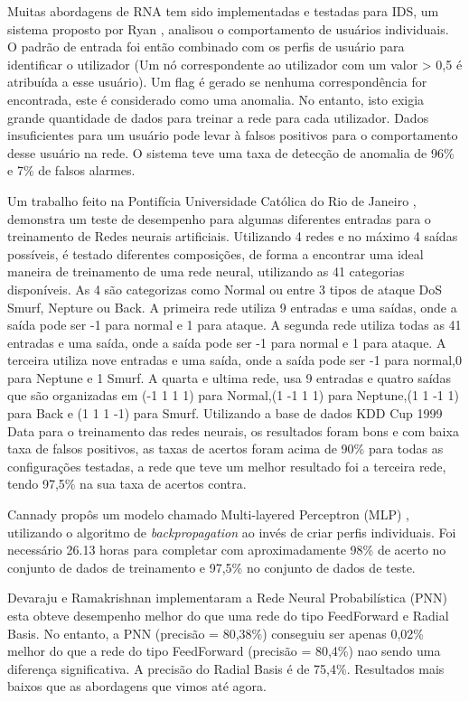 Muitas abordagens de RNA tem sido implementadas e testadas para IDS, um sistema proposto por Ryan \cite{Ryan}, analisou  o comportamento de usuários individuais. O padrão de entrada foi então combinado com os perfis de usuário para identificar o utilizador (Um nó correspondente ao utilizador com um valor > 0,5 é atribuída a esse usuário). Um flag é gerado se nenhuma correspondência for encontrada,  este é considerado como uma anomalia. No entanto, isto exigia grande quantidade de dados para treinar a rede para cada utilizador. Dados insuficientes para um usuário pode levar à falsos positivos para o comportamento desse usuário na rede. O sistema teve uma taxa de detecção de anomalia de 96\% e 7\% de falsos alarmes.

Um trabalho feito na Pontifícia Universidade Católica do Rio de Janeiro \cite{RenatoMaia}, demonstra um teste de desempenho para algumas diferentes entradas para o treinamento de Redes neurais artificiais.
Utilizando 4 redes e no máximo 4 saídas possíveis, é testado diferentes composições, de forma a encontrar uma ideal maneira de treinamento de uma rede neural, utilizando as 41 categorias disponíveis.
As 4 são categorizas como Normal ou entre 3 tipos de ataque DoS Smurf, Nepture ou Back.
A primeira rede utiliza 9 entradas e uma saídas, onde a saída pode ser -1 para normal e 1 para ataque.
A segunda rede utiliza todas as 41 entradas e uma saída, onde a saída pode ser -1 para normal e 1 para ataque.
A terceira utiliza nove entradas e uma saída, onde a saída pode ser -1 para normal,0 para Neptune e 1 Smurf.
A quarta e ultima rede, usa 9 entradas e quatro saídas que são organizadas em (-1 1 1 1) para Normal,(1 -1 1 1) para Neptune,(1 1 -1 1) para Back e (1 1 1 -1) para Smurf.
Utilizando a base de dados KDD Cup 1999 Data\cite{KDDCup99} para o treinamento das redes neurais, os resultados foram bons e com baixa taxa de falsos positivos, as taxas de acertos foram acima de 90\% para todas as configurações testadas, a rede que teve um melhor resultado foi a terceira rede, tendo 97,5\% na sua taxa de acertos contra.

Cannady propôs um modelo chamado Multi-layered Perceptron (MLP) \cite{Cannady}, utilizando o algoritmo de \textit{backpropagation} ao invés de criar perfis individuais. Foi necessário 26.13 horas para completar com aproximadamente 98\% de acerto no conjunto de dados de treinamento e 97,5\% no conjunto de dados de teste.

Devaraju e Ramakrishnan implementaram a  Rede Neural Probabilística (PNN) \cite{Devaraju} esta obteve desempenho melhor do que uma rede do tipo FeedForward e Radial Basis. No entanto, a PNN (precisão = 80,38\%) conseguiu ser apenas 0,02\% melhor do que a rede do tipo FeedForward (precisão = 80,4\%) nao sendo uma diferença significativa. A precisão do  Radial Basis é de 75,4\%.
Resultados mais baixos que as abordagens que vimos até agora.

